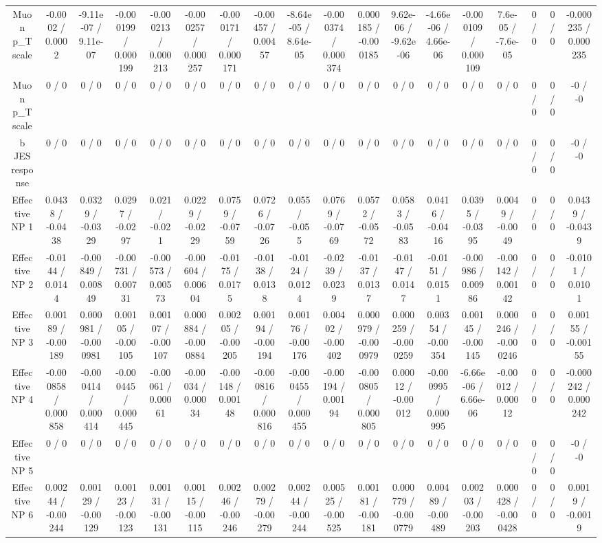 \documentclass[10pt]{article}
\begin{document}
\begin{table}[htbp]
\begin{center}
\begin{tabular}{|c|c|c|c|c|c|c|c|c|c|c|c|c|c|c|c|c|c|}
  Muon p_{T} scale & -0.0002 / 0.0002 & -9.11e-07 / 9.11e-07 & -0.000199 / 0.000199 & -0.000213 / 0.000213 & -0.000257 / 0.000257 & -0.000171 / 0.000171 & -0.00457 / 0.00457 & -8.64e-05 / 8.64e-05 & -0.000374 / 0.000374 & 0.000185 / -0.000185 & 9.62e-06 / -9.62e-06 & -4.66e-06 / 4.66e-06 & -0.000109 / 0.000109 & 7.6e-05 / -7.6e-05 & 0 / 0 & 0 / 0 & -0.000235 / 0.000235 \\ 
  Muon p_{T} scale & 0 / 0 & 0 / 0 & 0 / 0 & 0 / 0 & 0 / 0 & 0 / 0 & 0 / 0 & 0 / 0 & 0 / 0 & 0 / 0 & 0 / 0 & 0 / 0 & 0 / 0 & 0 / 0 & 0 / 0 & 0 / 0 & -0 / -0 \\ 
  b JES response & 0 / 0 & 0 / 0 & 0 / 0 & 0 / 0 & 0 / 0 & 0 / 0 & 0 / 0 & 0 / 0 & 0 / 0 & 0 / 0 & 0 / 0 & 0 / 0 & 0 / 0 & 0 / 0 & 0 / 0 & 0 / 0 & -0 / -0 \\ 
  Effective NP 1 & 0.0438 / -0.0438 & 0.0329 / -0.0329 & 0.0297 / -0.0297 & 0.021 / -0.021 & 0.0229 / -0.0229 & 0.0759 / -0.0759 & 0.0726 / -0.0726 & 0.055 / -0.055 & 0.0769 / -0.0769 & 0.0572 / -0.0572 & 0.0583 / -0.0583 & 0.0416 / -0.0416 & 0.0395 / -0.0395 & 0.0049 / -0.0049 & 0 / 0 & 0 / 0 & 0.0439 / -0.0439 \\ 
  Effective NP 2 & -0.0144 / 0.0144 & -0.00849 / 0.00849 & -0.00731 / 0.00731 & -0.00573 / 0.00573 & -0.00604 / 0.00604 & -0.0175 / 0.0175 & -0.0138 / 0.0138 & -0.0124 / 0.0124 & -0.0239 / 0.0239 & -0.0137 / 0.0137 & -0.0147 / 0.0147 & -0.0151 / 0.0151 & -0.00986 / 0.00986 & -0.00142 / 0.00142 & 0 / 0 & 0 / 0 & -0.0101 / 0.0101 \\ 
  Effective NP 3 & 0.00189 / -0.00189 & 0.000981 / -0.000981 & 0.00105 / -0.00105 & 0.00107 / -0.00107 & 0.000884 / -0.000884 & 0.00205 / -0.00205 & 0.00194 / -0.00194 & 0.00176 / -0.00176 & 0.00402 / -0.00402 & 0.000979 / -0.000979 & 0.000259 / -0.000259 & 0.00354 / -0.00354 & 0.00145 / -0.00145 & 0.000246 / -0.000246 & 0 / 0 & 0 / 0 & 0.00155 / -0.00155 \\ 
  Effective NP 4 & -0.000858 / 0.000858 & -0.000414 / 0.000414 & -0.000445 / 0.000445 & -0.00061 / 0.00061 & -0.00034 / 0.00034 & -0.00148 / 0.00148 & -0.000816 / 0.000816 & -0.000455 / 0.000455 & -0.00194 / 0.00194 & -0.000805 / 0.000805 & 0.00012 / -0.00012 & -0.000995 / 0.000995 & -6.66e-06 / 6.66e-06 & -0.00012 / 0.00012 & 0 / 0 & 0 / 0 & -0.000242 / 0.000242 \\ 
  Effective NP 5 & 0 / 0 & 0 / 0 & 0 / 0 & 0 / 0 & 0 / 0 & 0 / 0 & 0 / 0 & 0 / 0 & 0 / 0 & 0 / 0 & 0 / 0 & 0 / 0 & 0 / 0 & 0 / 0 & 0 / 0 & 0 / 0 & -0 / -0 \\ 
  Effective NP 6 & 0.00244 / -0.00244 & 0.00129 / -0.00129 & 0.00123 / -0.00123 & 0.00131 / -0.00131 & 0.00115 / -0.00115 & 0.00246 / -0.00246 & 0.00279 / -0.00279 & 0.00244 / -0.00244 & 0.00525 / -0.00525 & 0.00181 / -0.00181 & 0.000779 / -0.000779 & 0.00489 / -0.00489 & 0.00203 / -0.00203 & 0.000428 / -0.000428 & 0 / 0 & 0 / 0 & 0.0019 / -0.0019 \\ 

\end{tabular}
\end{center}
\end{table}
\end{document}
